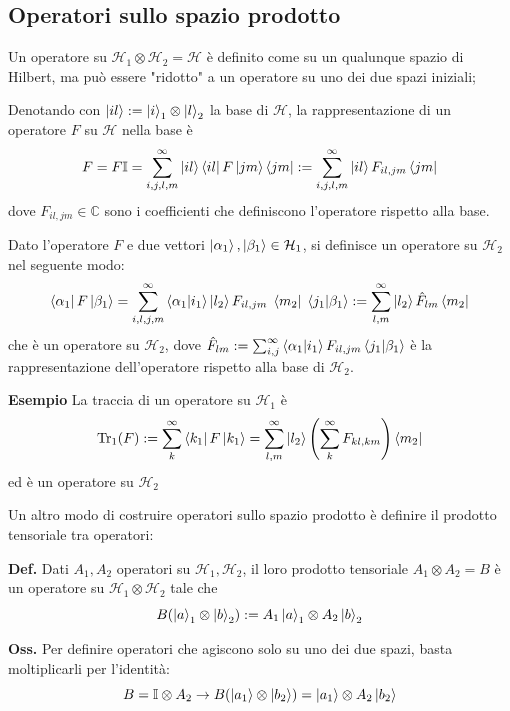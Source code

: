 \subsection{Operatori sullo spazio prodotto}
Un operatore su $\mathcal{H}_1\otimes\mathcal{H}_2 = \mathcal{H}$ è definito come su un qualunque
spazio di Hilbert, ma può essere "ridotto" a un operatore su uno dei due spazi iniziali;

Denotando con $\ket{il}:=\ket{i}_1\otimes\ket{l}_2$ la base di $\mathcal{H}$, la rappresentazione
di un operatore $F$ su $\mathcal{H}$ nella base è
$$
F = F\mathbb{I} = \sum_{i,j,l,m}^{\infty} \ket{il}\bra{il}F\ket{jm}\bra{jm} :=
\sum_{i,j,l,m}^{\infty} \ket{il}F_{il,jm}\bra{jm}
$$
dove $F_{il,jm}\in\mathbb{C}$ sono i coefficienti che definiscono l'operatore rispetto alla base.

Dato l'operatore $F$ e due vettori $\ket{\alpha_1},\ket{\beta_1}\in\mathcal{H}_1$, si definisce un
operatore su $\mathcal{H}_2$ nel seguente modo:
$$
\bra{\alpha_1}F\ket{\beta_1} = \sum_{i,l,j,m}^{\infty} \bra{\alpha_1}\ket{i_1}\ket{l_2} F_{il,jm}
\;\bra{m_2}\; \bra{j_1}\ket{\beta_1} := 
\sum_{l,m}^{\infty} \ket{l_2} \hat{F}_{lm}\bra{m_2}
$$
che è un operatore su $\mathcal{H}_2$, dove
$\hat{F}_{lm} := \sum_{i,j}^{\infty} \bra{\alpha_1}\ket{i_1} F_{il,jm} \bra{j_1}\ket{\beta_1} $
è la rappresentazione dell'operatore rispetto alla base di $\mathcal{H}_2$.

\textbf{Esempio} La traccia di un operatore su $\mathcal{H}_1$ è 
$$\Tr_1(F) := \sum_{k}^{\infty} \bra{k_1}F\ket{k_1} =
\sum_{l,m}^{\infty} \ket{l_2} \left(\sum_{k}^{\infty} F_{kl,km} \right)\bra{m_2}$$
ed è un operatore su $\mathcal{H}_2$


Un altro modo di costruire operatori sullo spazio prodotto è definire il prodotto tensoriale tra
operatori:

\textbf{Def.} Dati $A_1,A_2$ operatori su $\mathcal{H}_1,\mathcal{H}_2$, il loro prodotto tensoriale
$A_1\otimes A_2 = B$ è un operatore su $\mathcal{H}_1\otimes\mathcal{H}_2$ tale che
$$
B(\ket{a}_1\otimes\ket{b}_2) := A_1\ket{a}_1\otimes A_2\ket{b}_2
$$

\textbf{Oss.} Per definire operatori che agiscono solo su uno dei due spazi, basta moltiplicarli
per l'identità:
$$B=\mathbb{I}\otimes{A_2} \to B(\ket{a_1}\otimes\ket{b_2}) = \ket{a_1}\otimes A_2\ket{b_2}$$
